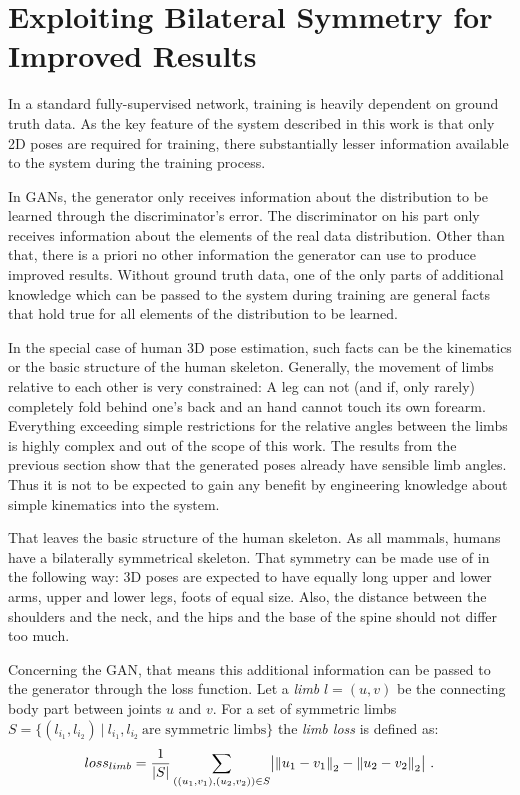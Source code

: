 \section{Exploiting Bilateral Symmetry for Improved Results}

In a standard fully-supervised network, training is heavily dependent on ground truth data.
As the key feature of the system described in this work is that only 2D poses are required for training, there substantially lesser information available to the system during the training process.

In GANs, the generator only receives information about the distribution to be learned through the discriminator's error.
The discriminator on his part only receives information about the elements of the real data distribution.
Other than that, there is a priori no other information the generator can use to produce improved results.
Without ground truth data, one of the only parts of additional knowledge which can be passed to the system during training are general facts that hold true for all elements of the distribution to be learned.

In the special case of human 3D pose estimation, such facts can be the kinematics or the basic structure of the human skeleton.
Generally, the movement of limbs relative to each other is very constrained:
A leg can not (and if, only rarely) completely fold behind one's back and an hand cannot touch its own forearm.
Everything exceeding simple restrictions for the relative angles between the limbs is highly complex and out of the scope of this work.
The results from the previous section show that the generated poses already have sensible limb angles.
Thus it is not to be expected to gain any benefit by engineering knowledge about simple kinematics into the system.

That leaves the basic structure of the human skeleton.
As all mammals, humans have a bilaterally symmetrical skeleton.
That symmetry can be made use of in the following way:
3D poses are expected to have equally long upper and lower arms, upper and lower legs, foots of equal size.
Also, the distance between the shoulders and the neck, and the hips and the base of the spine should not differ too much.

Concerning the GAN, that means this additional information can be passed to the generator through the loss function.
Let a \emph{limb} $l = (u, v)$ be the connecting body part between joints $u$ and $v$.
For a set of symmetric limbs $S = \{(l_{i_1}, l_{i_2})~|~ l_{i_1}, l_{i_2}\ \text{are symmetric limbs} \}$ the \emph{limb loss} is defined as:
\begin{equation}
loss_{limb} = \frac{1}{|S|}\sum_{((u_1, v_1), (u_2, v_2)) \in S} \bigl\lvert \norm{u_1 - v_1}_2 - \norm{u_2 - v_2}_2 \bigr\rvert \ .
\end{equation}


